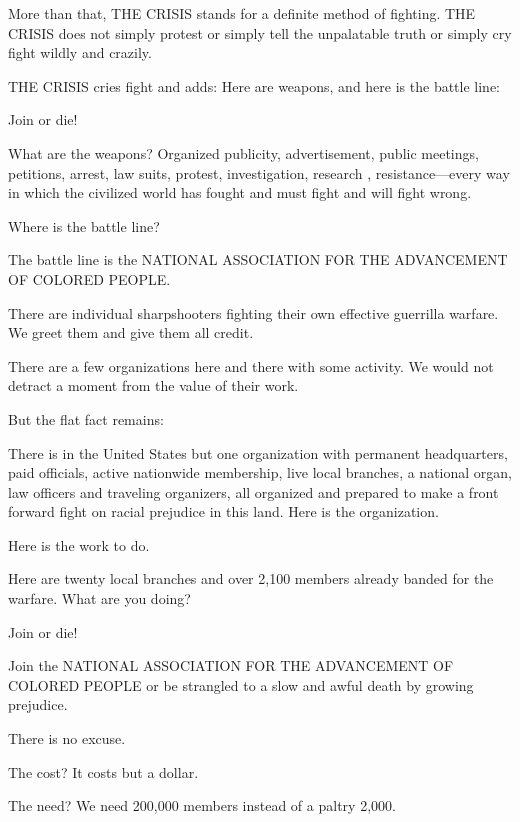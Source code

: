 \documentclass[letterpaper,10pt,english]{jupyterBook}
\begin{document}
\sphinxAtStartPar
More than that, THE CRISIS stands for a definite method of fighting. THE CRISIS does not simply protest or simply tell the unpalatable truth or simply cry fight wildly and crazily.

\sphinxAtStartPar
THE CRISIS cries fight and adds: Here are weapons, and here is the battle line:

\sphinxAtStartPar
Join or die!

\sphinxAtStartPar
What are the weapons? Organized publicity, advertisement, public meetings, petitions, arrest, law suits, protest, investigation, research , resistance—every way in which the civilized world has fought and must fight and will fight wrong.

\sphinxAtStartPar
Where is the battle line?

\sphinxAtStartPar
The battle line is the NATIONAL ASSOCIATION FOR THE ADVANCEMENT OF COLORED PEOPLE.

\sphinxAtStartPar
There are individual sharpshooters fighting their own effective guerrilla warfare. We greet them and give them all credit.

\sphinxAtStartPar
There are a few organizations here and there with some activity. We would not detract a moment from the value of their work.

\sphinxAtStartPar
But the flat fact remains:

\sphinxAtStartPar
There is in the United States but one organization with permanent headquarters, paid officials, active nation­wide membership, live local branches, a national organ, law officers and traveling organizers, all organized and prepared to make a front forward fight on racial prejudice in this land.
Here is the organization.

\sphinxAtStartPar
Here is the work to do.

\sphinxAtStartPar
Here are twenty local branches and over 2,100 members already banded for the warfare.
What are you doing?

\sphinxAtStartPar
Join or die!

\sphinxAtStartPar
Join the NATIONAL ASSOCIATION FOR THE ADVANCEMENT OF COLORED PEOPLE or be strangled to a slow and awful death by growing prejudice.

\sphinxAtStartPar
There is no excuse.

\sphinxAtStartPar
The cost? It costs but a dollar.

\sphinxAtStartPar
The need? We need 200,000 members instead of a paltry 2,000.
\end{document}
